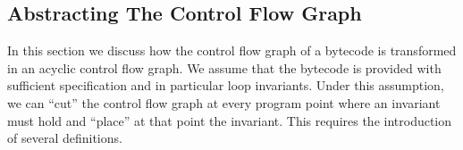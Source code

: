 
\subsection{Abstracting The Control Flow Graph}\label{abstrCntrFlow}
In this section we discuss how the control flow graph of a bytecode is transformed in an acyclic control flow graph. We assume that the bytecode is provided 
with sufficient specification and in particular loop invariants. Under this assumption, we can ``cut'' the control flow graph at every program point
where an invariant must hold and ``place'' at that point the invariant. This requires the introduction of several definitions.

     
